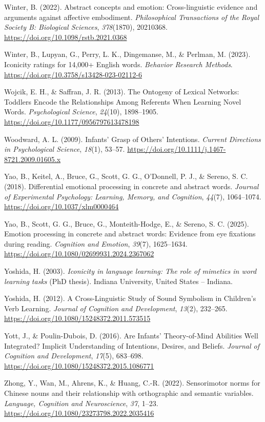 \documentclass[
  man,floatsintext]{apa6}
\newlength{\cslhangindent}
\newenvironment{CSLReferences}[2] %
 {\begin{list}{}{%
  \setlength{\itemindent}{0pt}
  \setlength{\leftmargin}{0pt}
  \setlength{\parsep}{0pt}
  \ifodd #1
   \setlength{\leftmargin}{\cslhangindent}
   \setlength{\itemindent}{-1\cslhangindent}
  \fi
  \setlength{\itemsep}{#2\baselineskip}}}
 {\end{list}}
\begin{document}
\begin{CSLReferences}{1}{0}
Winter, B. (2022). Abstract concepts and emotion: Cross-linguistic evidence and arguments against affective embodiment. \emph{Philosophical Transactions of the Royal Society B: Biological Sciences}, \emph{378}(1870), 20210368. \url{https://doi.org/10.1098/rstb.2021.0368}

Winter, B., Lupyan, G., Perry, L. K., Dingemanse, M., \& Perlman, M. (2023). Iconicity ratings for 14,000+ {English} words. \emph{Behavior Research Methods}. \url{https://doi.org/10.3758/s13428-023-02112-6}

Wojcik, E. H., \& Saffran, J. R. (2013). The {Ontogeny} of {Lexical Networks}: {Toddlers Encode} the {Relationships Among Referents When Learning Novel Words}. \emph{Psychological Science}, \emph{24}(10), 1898--1905. \url{https://doi.org/10.1177/0956797613478198}

Woodward, A. L. (2009). Infants' {Grasp} of {Others}' {Intentions}. \emph{Current Directions in Psychological Science}, \emph{18}(1), 53--57. \url{https://doi.org/10.1111/j.1467-8721.2009.01605.x}

Yao, B., Keitel, A., Bruce, G., Scott, G. G., O'Donnell, P. J., \& Sereno, S. C. (2018). Differential emotional processing in concrete and abstract words. \emph{Journal of Experimental Psychology: Learning, Memory, and Cognition}, \emph{44}(7), 1064--1074. \url{https://doi.org/10.1037/xlm0000464}

Yao, B., Scott, G. G., Bruce, G., Monteith-Hodge, E., \& Sereno, S. C. (2025). Emotion processing in concrete and abstract words: Evidence from eye fixations during reading. \emph{Cognition and Emotion}, \emph{39}(7), 1625--1634. \url{https://doi.org/10.1080/02699931.2024.2367062}

Yoshida, H. (2003). \emph{Iconicity in language learning: {The} role of mimetics in word learning tasks} (PhD thesis). Indiana University, United States -- Indiana.

Yoshida, H. (2012). A {Cross-Linguistic Study} of {Sound Symbolism} in {Children}'s {Verb Learning}. \emph{Journal of Cognition and Development}, \emph{13}(2), 232--265. \url{https://doi.org/10.1080/15248372.2011.573515}

Yott, J., \& Poulin-Dubois, D. (2016). Are {Infants}' {Theory-of-Mind Abilities Well Integrated}? {Implicit Understanding} of {Intentions}, {Desires}, and {Beliefs}. \emph{Journal of Cognition and Development}, \emph{17}(5), 683--698. \url{https://doi.org/10.1080/15248372.2015.1086771}

Zhong, Y., Wan, M., Ahrens, K., \& Huang, C.-R. (2022). Sensorimotor norms for {Chinese} nouns and their relationship with orthographic and semantic variables. \emph{Language, Cognition and Neuroscience}, \emph{37}, 1--23. \url{https://doi.org/10.1080/23273798.2022.2035416}

\end{CSLReferences}
\end{document}
